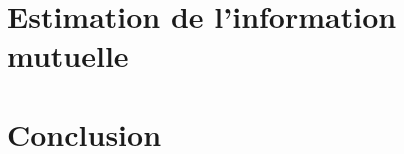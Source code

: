 \documentclass{report}
\begin{document}
\section{Estimation de l'information mutuelle}





\section{Conclusion}


\end{document}
